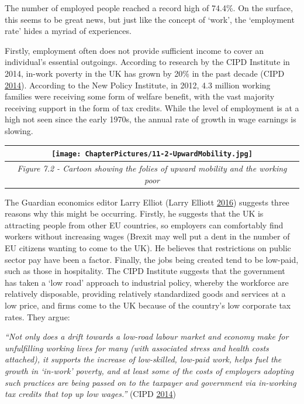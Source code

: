 \documentclass[]{tufte-handout}
\begin{document}
The number of employed people reached a record high of 74.4\%. On the
surface, this seems to be great news, but just like the concept of
`work', the `employment rate' hides a myriad of experiences.

Firstly, employment often does not provide sufficient income to cover an
individual's essential outgoings. According to research by the CIPD
Institute in 2014, in-work poverty in the UK has grown by 20\% in the
past decade (CIPD \protect\hyperlink{ref-CIPD2014}{2014}). According to
the New Policy Institute, in 2012, 4.3 million working families were
receiving some form of welfare benefit, with the vast majority receiving
support in the form of tax credits. While the level of employment is at
a high not seen since the early 1970s, the annual rate of growth in wage
earnings is slowing.

\begin{longtable}[]{@{}c@{}}
\toprule
\begin{minipage}[b]{0.97\columnwidth}\centering
\texttt{[image: ChapterPictures/11-2-UpwardMobility.jpg]}\strut
\end{minipage}\tabularnewline
\midrule
\endhead
\begin{minipage}[t]{0.97\columnwidth}\centering
\emph{Figure 7.2 - Cartoon showing the folies of upward mobility and the
working poor}\strut
\end{minipage}\tabularnewline
\bottomrule
\end{longtable}

The Guardian economics editor Larry Elliot (Larry Elliott
\protect\hyperlink{ref-LarryElliott2016}{2016}) suggests three reasons
why this might be occurring. Firstly, he suggests that the UK is
attracting people from other EU countries, so employers can comfortably
find workers without increasing wages (Brexit may well put a dent in the
number of EU citizens wanting to come to the UK). He believes that
restrictions on public sector pay have been a factor. Finally, the jobs
being created tend to be low-paid, such as those in hospitality. The
CIPD Institute suggests that the government has taken a `low road'
approach to industrial policy, whereby the workforce are relatively
disposable, providing relatively standardized goods and services at a
low price, and firms come to the UK because of the country's low
corporate tax rates. They argue:

\emph{``Not only does a drift towards a low-road labour market and
economy make for unfulfilling working lives for many (with associated
stress and health costs attached), it supports the increase of
low-skilled, low-paid work, helps fuel the growth in `in-work' poverty,
and at least some of the costs of employers adopting such practices are
being passed on to the taxpayer and government via in-working tax
credits that top up low wages.''} (CIPD
\protect\hyperlink{ref-CIPD2014}{2014})
\end{document}
